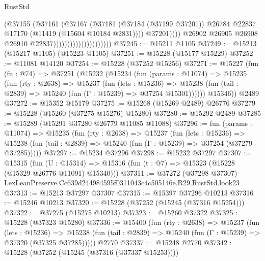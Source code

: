 \begin{lexlean}{RustStd}
\begin{coremodule}
                                                  (@37155
                                                    (@37161
                                                      (@37167
                                                        (@37181
                                                          (@37184 (@37199 @37201))
                                                          @26784
                                                          @22837
                                                          @17170
                                                          (@11419 (@15604 @10184 @2831))))
                                                      @37201))))
                                              @26902
                                              @26905
                                              @26908
                                              @26910
                                              @22837)))))))))))))))))))))
@37245 := @15211 @1105
@37249 := @15213 (@15217 @1105) (@15223 @1105)
@37251 := @15228 (@15177 @15229)
@37252 := @11081 @14120
@37254 := @15228 (@37252 @15256)
@37271 := @15227
    (fun (fn : @74) =>
    @37251
      (@15232
        (@15234
          (fun (params : @11074) =>
          @15235
            (fun (rty : @2638) =>
            @15237
              (fun (lets : @15236) =>
              @15238 (fun (tail : @2839) => @15240 (fun (Γ : @15239) => @37254 @15301))))))
        @15346))
    @2489
@37272 := @15352 @15179
@37275 := @15268 (@15269 @2489) @26776
@37279 := @15228 (@15260 (@37275 @15276) @15280)
@37280 := @15292 @2489
@37285 := @15289 (@15291 @37280 @26779 @11085 @11088)
@37296 := fun (params : @11074) =>
  @15235
    (fun (rty : @2638) =>
    @15237
      (fun (lets : @15236) =>
      @15238 (fun (tail : @2839) => @15240 (fun (Γ : @15239) => @37254 (@37279 @37285)))))
@37297 := @15234 @37296
@37298 := @15232 @37297
@37307 := @15315
    (fun (U : @15314) => @15316 (fun (t : @7) => @15323 (@15228 (@15329 @26776 @11091) @15340)))
@37311 := @37272
    (@37298 @37307)
    LexLeanPreserve.Cc639d244984595f0311043c4c505146e.R29.RustStd.look23
@37313 := @15213 @37297 @37307
@37315 := @15397 @37296 @10213
@37316 := @15246 @10213
@37320 := @15228 (@37252 (@15245 (@37316 @15254)))
@37322 := @37275 (@15275 @10213)
@37323 := @15260 @37322
@37325 := @15228 (@37323 @15280)
@37336 := @15400
    (fun (rty : @2638) =>
    @15237
      (fun (lets : @15236) =>
      @15238 (fun (tail : @2839) => @15240 (fun (Γ : @15239) => @37320 (@37325 @37285)))))
    @2770
@37337 := @15248 @2770
@37342 := @15228 (@37252 (@15245 (@37316 (@37337 @15253))))

\end{coremodule}
\end{lexlean}
